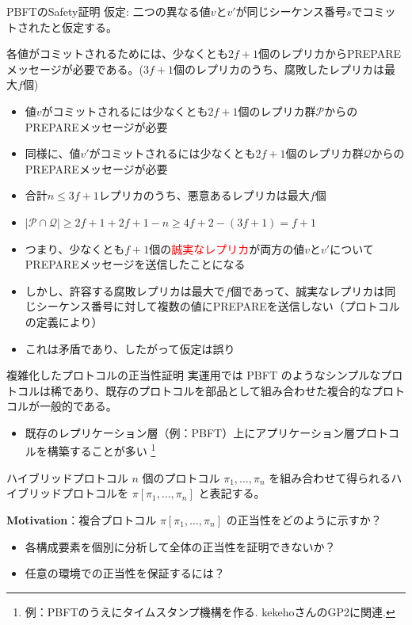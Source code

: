 \documentclass[aspectratio=169,10pt]{beamer}
\newenvironment{proofblock}[1][]
{\begin{block}{#1}\vspace{0.5em}}
{\vspace{0.5em}\end{block}}
\begin{document}
\begin{frame}{PBFTのSafety証明}
仮定: 二つの異なる値$v$と$v'$が同じシーケンス番号$s$でコミットされたと仮定する。

\begin{lemma}
各値がコミットされるためには、少なくとも$2f+1$個のレプリカからPREPAREメッセージが必要である。($3f+1$個のレプリカのうち、腐敗したレプリカは最大$f$個)
\end{lemma}

\begin{itemize}
    \item \small 値$v$がコミットされるには少なくとも$2f+1$個のレプリカ群$\mathcal{P}$からのPREPAREメッセージが必要
    \item \small 同様に、値$v'$がコミットされるには少なくとも$2f+1$個のレプリカ群$\mathcal{Q}$からのPREPAREメッセージが必要
    \item \small 合計$n \leq 3f+1$レプリカのうち、悪意あるレプリカは最大$f$個
    \item \small $| \mathcal{P} \cap \mathcal{Q} | \geq 2f+1 + 2f+1 - n \geq 4f+2 - (3f+1) = f+1$
    \item \small つまり、少なくとも$f+1$個の\textcolor{red}{誠実なレプリカ}が両方の値$v$と$v'$についてPREPAREメッセージを送信したことになる
    \item \small しかし、許容する腐敗レプリカは最大で$f$個であって、誠実なレプリカは同じシーケンス番号に対して複数の値にPREPAREを送信しない（プロトコルの定義により）
    \item \small これは矛盾であり、したがって仮定は誤り
\end{itemize}
\end{frame}

\begin{frame}{複雑化したプロトコルの正当性証明}
  実運用では PBFT のようなシンプルなプロトコルは稀であり、既存のプロトコルを部品として組み合わせた複合的なプロトコルが一般的である。

  \begin{itemize}
    \item 既存のレプリケーション層（例：PBFT）上にアプリケーション層プロトコルを構築することが多い
          \footnote{例：PBFTのうえにタイムスタンプ機構を作る. kekehoさんのGP2に関連.}
  \end{itemize}

  \begin{proofblock}[ハイブリッドプロトコル]
    $n$ 個のプロトコル $\pi_1,\dots,\pi_n$ を組み合わせて得られるハイブリッドプロトコルを $\pi[\pi_1,\dots,\pi_n]$ と表記する。
    
  \end{proofblock}

  \textbf{Motivation}：複合プロトコル $\pi[\pi_1,\dots,\pi_n]$ の正当性をどのように示すか？
  \begin{itemize}
    \item 各構成要素を個別に分析して全体の正当性を証明できないか？
    \item 任意の環境での正当性を保証するには？
  \end{itemize}
\end{frame}
\end{document}
